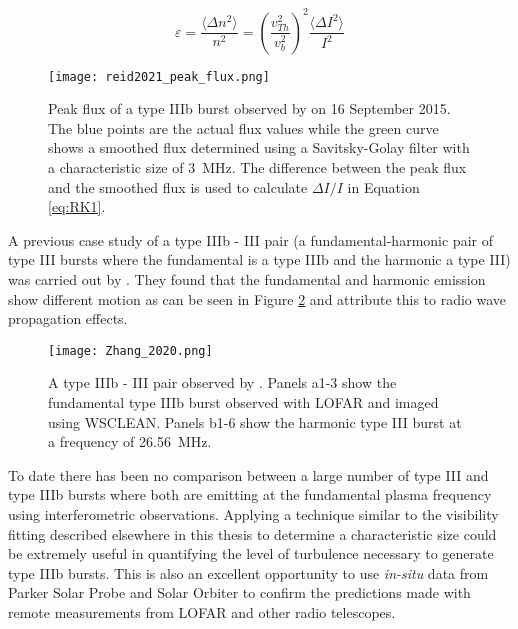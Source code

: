 \begin{equation}
\varepsilon = \frac{\langle\Delta n^2\rangle}{n^2} = \left(\frac{v^2_{Th}}{v^2_b}\right)^2 \frac{\langle \Delta I^2\rangle}{I^2}
\label{eq:RK1}
\end{equation}

\begin{figure}[ht]
\centering
\texttt{[image: reid2021\_peak\_flux.png]}
\caption[Peak flux of a type IIIb burst observed by \cite{Reid2021}.]{Peak flux of a type IIIb burst observed by \cite{Reid2021} on 16 September 2015. The blue points are the actual flux values while the green curve shows a smoothed flux determined using a Savitsky-Golay filter with a characteristic size of 3~MHz. The difference between the peak flux and the smoothed flux is used to calculate $\Delta I/I$ in Equation \ref{eq:RK1}.}
\label{fig:reid_peakflux}
\end{figure}

A previous case study of a type IIIb - III pair (a fundamental-harmonic pair of type III bursts where the fundamental is a type IIIb and the harmonic a type III) was carried out by \cite{Zhang2020}. They found that the fundamental and harmonic emission show different motion as can be seen in Figure \ref{fig:typeIIIbIII} and attribute this to radio wave propagation effects.

\begin{figure}[ht]
\centering
\texttt{[image: Zhang\_2020.png]}
\caption[Type IIIb - III pair observed by \cite{Zhang2020}.]{A type IIIb - III pair observed by \cite{Zhang2020}. Panels a1-3 show the fundamental type IIIb burst observed with LOFAR and imaged using WSCLEAN. Panels b1-6 show the harmonic type III burst at a frequency of 26.56~MHz.}
\label{fig:typeIIIbIII}
\end{figure}

To date there has been no comparison between a large number of type III and type IIIb bursts where both are emitting at the fundamental plasma frequency using interferometric observations. Applying a technique similar to the visibility fitting described elsewhere in this thesis to determine a characteristic size could be extremely useful in quantifying the level of turbulence necessary to generate type IIIb bursts. This is also an excellent opportunity to use \textit{in-situ} data from Parker Solar Probe \citep[PSP;][]{Fox2016} and Solar Orbiter \citep{Muller2020} to confirm the predictions made with remote measurements from LOFAR and other radio telescopes. 

